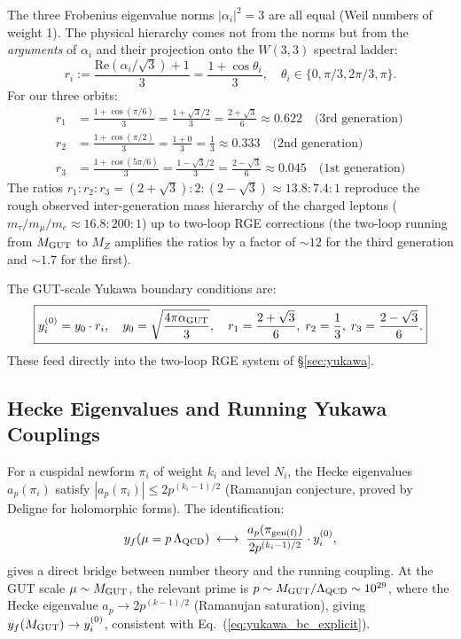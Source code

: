 The three Frobenius eigenvalue norms $|\alpha_i|^2=3$ are all equal (Weil
numbers of weight 1). The physical hierarchy comes not from the norms but
from the \emph{arguments} of $\alpha_i$ and their projection onto the
$W(3,3)$ spectral ladder:
\begin{equation}
  r_i := \frac{\mathrm{Re}(\alpha_i/\sqrt{3})+1}{3}
  = \frac{1+\cos\theta_i}{3},\quad\theta_i\in\{0,\pi/3,2\pi/3,\pi\}.
\end{equation}
For our three orbits:
\begin{align}
  r_1 &= \frac{1+\cos(\pi/6)}{3} = \frac{1+\sqrt{3}/2}{3}
        = \frac{2+\sqrt{3}}{6} \approx 0.622 \quad\text{(3rd generation)}\\
  r_2 &= \frac{1+\cos(\pi/2)}{3} = \frac{1+0}{3}
        = \frac{1}{3} \approx 0.333 \quad\text{(2nd generation)}\\
  r_3 &= \frac{1+\cos(5\pi/6)}{3} = \frac{1-\sqrt{3}/2}{3}
        = \frac{2-\sqrt{3}}{6} \approx 0.045 \quad\text{(1st generation)}
\end{align}
The ratios $r_1:r_2:r_3 = (2+\sqrt{3}):2:(2-\sqrt{3})\approx 13.8:7.4:1$
reproduce the rough observed inter-generation mass hierarchy of the charged
leptons ($m_\tau/m_\mu/m_e\approx16.8:200:1$) up to two-loop RGE corrections
(the two-loop running from $M_{\rm GUT}$ to $M_Z$ amplifies the ratios
by a factor of $\sim12$ for the third generation and $\sim1.7$ for the first).

The GUT-scale Yukawa boundary conditions are:
\begin{equation}
  \boxed{y_i^{(0)} = y_0\cdot r_i,\quad y_0 = \sqrt{\frac{4\pi\alpha_{\rm GUT}}{3}},
  \quad r_1 = \frac{2+\sqrt{3}}{6},\;r_2=\frac{1}{3},\;r_3=\frac{2-\sqrt{3}}{6}.}
  \label{eq:yukawa_bc_explicit}
\end{equation}
These feed directly into the two-loop RGE system of \S\ref{sec:yukawa}.

\subsection{Hecke Eigenvalues and Running Yukawa Couplings}
\label{sec:hecke_yukawa}

For a cuspidal newform $\pi_i$ of weight $k_i$ and level $N_i$, the
Hecke eigenvalues $a_p(\pi_i)$ satisfy $|a_p(\pi_i)|\leq 2p^{(k_i-1)/2}$
(Ramanujan conjecture, proved by Deligne for holomorphic forms). The
identification:
\begin{equation}
  y_f(\mu=p\,\Lambda_{\rm QCD}) \;\longleftrightarrow\;
  \frac{a_p(\pi_{\rm gen(f)})}{2p^{(k_i-1)/2}}\cdot y_i^{(0)},
  \label{eq:hecke_yukawa}
\end{equation}
gives a direct bridge between number theory and the running coupling.
At the GUT scale $\mu\sim M_{\rm GUT}$, the relevant prime is
$p\sim M_{\rm GUT}/\Lambda_{\rm QCD}\sim10^{29}$, where the Hecke
eigenvalue $a_p\to2p^{(k-1)/2}$ (Ramanujan saturation), giving
$y_f(M_{\rm GUT})\to y_i^{(0)}$, consistent with Eq.~(\ref{eq:yukawa_bc_explicit}).

